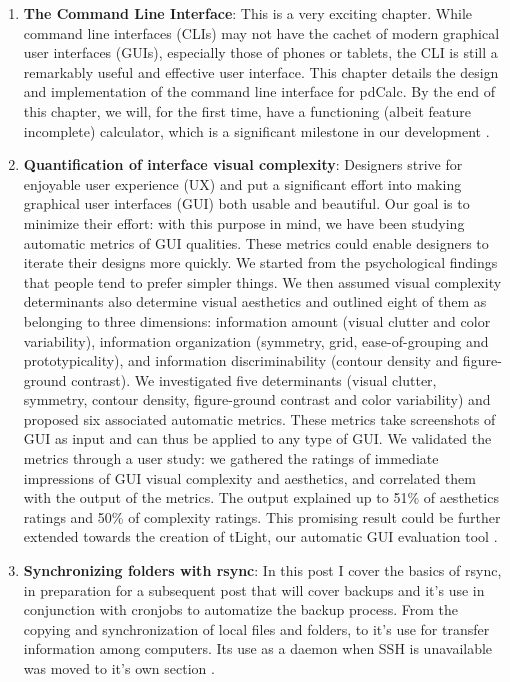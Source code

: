 \begin{englishtext}
\begin{enumerate}
    \item \textbf{The Command Line Interface}: This is a very exciting chapter.
    While command line interfaces (CLIs) may not have the cachet of modern
    graphical user interfaces (GUIs), especially those of phones or tablets, the
    CLI is still a remarkably useful and effective user interface. This chapter
    details the design and implementation of the command line interface for
    pdCalc. By the end of this chapter, we will, for the first time, have a
    functioning (albeit feature incomplete) calculator, which is a significant
    milestone in our development \cite{commandLineInterface}.

    \item \textbf{Quantification of interface visual complexity}: Designers
    strive for enjoyable user experience (UX) and put a significant effort into
    making graphical user interfaces (GUI) both usable and beautiful. Our goal
    is to minimize their effort: with this purpose in mind, we have been
    studying automatic metrics of GUI qualities. These metrics could enable
    designers to iterate their designs more quickly. We started from the
    psychological findings that people tend to prefer simpler things. We then
    assumed visual complexity determinants also determine visual aesthetics and
    outlined eight of them as belonging to three dimensions: information amount
    (visual clutter and color variability), information organization (symmetry,
    grid, ease-of-grouping and prototypicality), and information
    discriminability (contour density and figure-ground contrast). We
    investigated five determinants (visual clutter, symmetry, contour density,
    figure-ground contrast and color variability) and proposed six associated
    automatic metrics. These metrics take screenshots of GUI as input and can
    thus be applied to any type of GUI. We validated the metrics through a user
    study: we gathered the ratings of immediate impressions of GUI visual
    complexity and aesthetics, and correlated them with the output of the
    metrics. The output explained up to 51\% of aesthetics ratings and 50\% of
    complexity ratings. This promising result could be further extended towards
    the creation of tLight, our automatic GUI evaluation tool
    \cite{quantificationOfInterface}.

    \item \textbf{Synchronizing folders with rsync}: In this post I cover the
    basics of rsync, in preparation for a subsequent post that will cover
    backups and it's use in conjunction with cronjobs to automatize the backup
    process. From the copying and synchronization of local files and folders, to
    it's use for transfer information among computers. Its use as a daemon when
    SSH is unavailable was moved to it's own section
    \cite{synchronizingFolders}.


\end{enumerate}
\end{englishtext}



